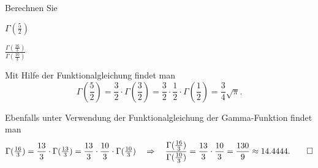 Berechnen Sie
\begin{teilaufgaben}
\item $\Gamma(\frac{5}2)$
\item $\displaystyle \frac{\Gamma(\frac{16}3)}{\Gamma(\frac{10}3)}$
\end{teilaufgaben}

\begin{loesung}
\begin{teilaufgaben}
\item
Mit Hilfe der Funktionalgleichung findet man
\[
\Gamma({\textstyle\frac52})
=
\frac32
\cdot
\Gamma({\textstyle\frac32})
=
\frac32
\cdot
\frac12
\cdot
\Gamma({\textstyle\frac12})
=
\frac{3}{4}\sqrt{\pi}.
\]
\item
Ebenfalls unter Verwendung der Funktionalgleichung der Gamma-Funktion 
findet man
\[
\Gamma({\textstyle\frac{16}3})
=
\frac{13}3
\cdot
\Gamma({\textstyle\frac{13}3})
=
\frac{13}3
\cdot
\frac{10}3
\cdot
\Gamma({\textstyle\frac{10}3})
\quad\Rightarrow\quad
\frac{\Gamma(\frac{16}3)}{\Gamma(\frac{10}3)}
=
\frac{13}3\cdot\frac{10}3
=
\frac{130}{9}
\approx
14.4444.
\qedhere
\]
\end{teilaufgaben}
\end{loesung}
